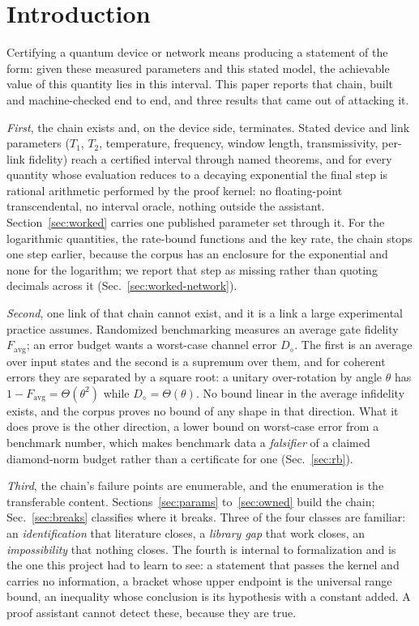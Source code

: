 \documentclass[aps,pra,reprint,nofootinbib,superscriptaddress]{revtex4-2}
\theoremstyle{plain}
\theoremstyle{definition}
\theoremstyle{remark}
\newcommand{\ddist}{D_{\diamond}}
\begin{document}

\section{Introduction}
\label{sec:intro}

Certifying a quantum device or network means producing a statement of the
form: given these measured parameters and this stated model, the
achievable value of this quantity lies in this interval. This paper
reports that chain, built and machine-checked end to end, and three
results that came out of attacking it.

\emph{First}, the chain exists and, on the device side, terminates.
Stated device and link parameters ($T_1$, $T_2$, temperature, frequency,
window length, transmissivity, per-link fidelity) reach a certified
interval through named theorems, and for every quantity whose evaluation
reduces to a decaying exponential the final step is rational arithmetic
performed by the proof kernel: no floating-point transcendental, no
interval oracle, nothing outside the assistant.
Section~\ref{sec:worked} carries one published parameter set through it.
For the logarithmic quantities, the rate-bound functions and the key
rate, the chain stops one step earlier, because the corpus has an
enclosure for the exponential and none for the logarithm; we report that
step as missing rather than quoting decimals across it
(Sec.~\ref{sec:worked-network}).

\emph{Second}, one link of that chain cannot exist, and it is a link a
large experimental practice assumes. Randomized benchmarking measures an
average gate fidelity $F_{\mathrm{avg}}$; an error budget wants a
worst-case channel error $\ddist$. The first is an average over input
states and the second is a supremum over them, and for coherent errors
they are separated by a square root: a unitary over-rotation by angle
$\theta$ has $1-F_{\mathrm{avg}} = \Theta(\theta^2)$ while
$\ddist = \Theta(\theta)$. No bound linear in the average infidelity
exists, and the corpus proves no bound of any shape in that direction.
What it does prove is the other direction, a lower bound on worst-case
error from a benchmark number, which makes benchmark data a
\emph{falsifier} of a claimed diamond-norm budget rather than a
certificate for one (Sec.~\ref{sec:rb}).

\emph{Third}, the chain's failure points are enumerable, and the
enumeration is the transferable content. Sections~\ref{sec:params}
to~\ref{sec:owned} build the chain; Sec.~\ref{sec:breaks} classifies
where it breaks. Three of the four classes are familiar: an
\emph{identification} that literature closes, a \emph{library gap} that
work closes, an \emph{impossibility} that nothing closes. The fourth is
internal to formalization and is the one this project had to learn to
see: a statement that passes the kernel and carries no information, a
bracket whose upper endpoint is the universal range bound, an inequality
whose conclusion is its hypothesis with a constant added. A proof
assistant cannot detect these, because they are true.
\end{document}
